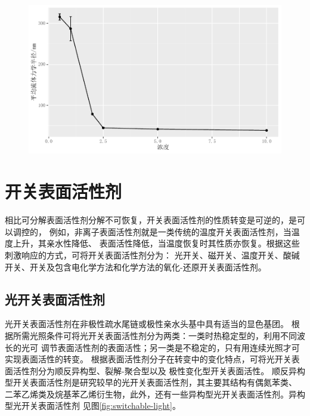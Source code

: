 \documentclass[bachelor,winfonts]{jnuthesis} %
\begin{document}
        \begin{figure}
            \centering
            \includegraphics[width=0.7\linewidth]{Figure/test.pdf}
            \caption{}
            \label{fig:plot01}
        \end{figure}
        
    \section{开关表面活性剂}
    相比可分解表面活性剂分解不可恢复，开关表面活性剂的性质转变是可逆的，是可以调控的，
    例如，非离子表面活性剂就是一类传统的温度开关表面活性剂，当温度上升，其亲水性降低、
    表面活性降低，当温度恢复时其性质亦恢复。根据这些刺激响应的方式，可将开关表面活性剂分为：
    光开关、磁开关、温度开关、酸碱开关、开关及包含电化学方法和化学方法的氧化-还原开关表面活性剂\cite{秦勇2009}。
    
    \subsection{光开关表面活性剂}
    光开关表面活性剂在非极性疏水尾链或极性亲水头基中具有适当的显色基团\cite{张冤帝2017}。
    根据所需光照条件可将光开关表面活性剂分为两类：一类时热稳定型的，利用不同波长的光可
    调节表面活性剂的表面活性；另一类是不稳定的，只有用连续光照才可实现表面活性的转变。
    根据表面活性剂分子在转变中的变化特点，可将光开关表面活性剂分为顺反异构型、裂解-聚合型以及
    极性变化型开关表面活性\cite{张冤帝2017,李云霞2011}。
    顺反异构型开关表面活性剂是研究较早的光开关表面活性剂，其主要其结构有偶氮苯类、
    二苯乙烯类及烷基苯乙烯衍生物，此外，还有一些异构型光开关表面活性剂。异构型光开关表面活性剂
    见图\ref{fig:switchable-light}\cite{张冤帝2017,karthaus1996,shang2003,吕湘亮2018}。
    
\end{document}
